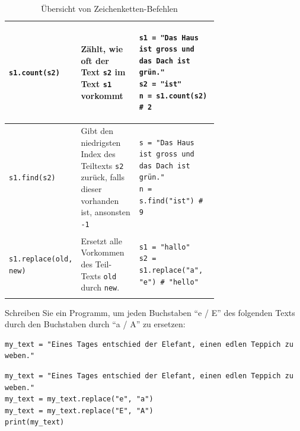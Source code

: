 \begin{table}[H]
\begin{tabular}{l|p{0.3\linewidth}|p{0.4\linewidth}}
\lstinline|s1.count(s2)| & Zählt, wie oft der Text \lstinline|s2| im Text \lstinline|s1| vorkommt & \begin{minipage}{\linewidth}
\begin{lstlisting}[numbers=none]
s1 = "Das Haus ist gross und das Dach ist grün."
s2 = "ist"
n = s1.count(s2) # 2
\end{lstlisting}
\end{minipage}\\\midrule
\lstinline|s1.find(s2)| & Gibt den niedrigsten Index des Teiltexts \lstinline|s2| zurück, falls dieser vorhanden ist, ansonsten \lstinline|-1| & \begin{minipage}{\linewidth}
\begin{lstlisting}[numbers=none]
s = "Das Haus ist gross und das Dach ist grün."
n = s.find("ist") # 9
\end{lstlisting}
\end{minipage}\\\midrule
\lstinline|s1.replace(old, new)| & Ersetzt alle Vorkommen des Teil-Texts \lstinline|old| durch \lstinline|new|. & \begin{minipage}{\linewidth}
\begin{lstlisting}[numbers=none]
s1 = "hallo"
s2 = s1.replace("a", "e") # "hello"
\end{lstlisting}
\end{minipage}
\end{tabular}
\caption{Übersicht von Zeichenketten-Befehlen}
\label{tab:string-op}
\end{table}
\begin{myexercise}
Schreiben Sie ein Programm, um jeden Buchstaben ``e / E'' des folgenden Texts durch den Buchstaben durch ``a / A'' zu ersetzen:

\begin{lstlisting}
my_text = "Eines Tages entschied der Elefant, einen edlen Teppich zu weben."
\end{lstlisting}

\begin{myanswer}
\begin{lstlisting}
my_text = "Eines Tages entschied der Elefant, einen edlen Teppich zu weben."
my_text = my_text.replace("e", "a")
my_text = my_text.replace("E", "A")
print(my_text)
\end{lstlisting}
\end{myanswer}
\end{myexercise}

